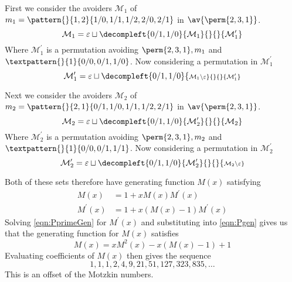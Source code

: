 \begin{frame}
  First we consider the avoiders \(\mathcal{M}_1\) of \(m_1 = \pattern{}{1,2}{1/0,1/1,1/2,2/0,2/1} \) in \(\av{\perm{2,3,1}}\).
  \begin{equation*}
    \mathcal{M}_1 = \varepsilon \sqcup
    \decompleft{0/1,1/0}{\mathcal{M}_1}{}{}{\mathcal{M}^\prime_1}
\end{equation*}
Where \(\mathcal{M}^\prime_1\) is a permutation avoiding \(\perm{2,3,1}, m_1\)
and \(\textpattern{}{1}{0/0,0/1,1/0}\). \pause Now considering a permutation in \(\mathcal{M}^\prime_1\)
\begin{equation*}
    \mathcal{M}^\prime_1 = \varepsilon \sqcup
    \decompleft{0/1,1/0}{\scriptstyle \mathcal{M}_1\setminus\varepsilon}{}{}{\mathcal{M}^\prime_1}
\end{equation*}
\end{frame}

\begin{frame}
  Next we consider the avoiders \(\mathcal{M}_2\) of \(m_2 = \pattern{}{2,1}{0/1,1/0,1/1,1/2,2/1}\) in \(\av{\perm{2,3,1}}\).
  \begin{equation*}
    \mathcal{M}_2 = \varepsilon \sqcup
    \decompleft{0/1,1/0}{\mathcal{M}^\prime_2}{}{}{\mathcal{M}_2}
\end{equation*}
Where \(\mathcal{M}^\prime_2\) is a permutation avoiding \(\perm{2,3,1}, m_2\)
and \(\textpattern{}{1}{0/0,0/1,1/1}\). \pause Now considering a permutation in \(\mathcal{M}^\prime_2\)
\begin{equation*}
    \mathcal{M}^\prime_2 = \varepsilon \sqcup
    \decompleft{0/1,1/0}{\mathcal{M}^\prime_2}{}{}{\scriptstyle \mathcal{M}_2\setminus\varepsilon}
\end{equation*}
\end{frame}
\begin{frame}
  Both of these sets therefore have generating function \(M(x)\) satisfying
  \begin{align}
    M(x) &= 1 + xM(x)M^\prime(x) \label{eqn:Pgen}\\
    M^\prime(x) &= 1 + x(M(x)-1)M^\prime(x)\label{eqn:PprimeGen}
 \end{align}\pause
 Solving \ref{eqn:PprimeGen} for \(M^\prime(x)\) and substituting into
\ref{eqn:Pgen} gives us that the generating function for
\(M(x)\) satisfies
\begin{equation}
    M(x) = xM^2(x) - x(M(x) - 1) + 1
\end{equation}\pause
Evaluating coefficients of \(M(x)\) then gives the sequence
\begin{equation*}
    1, 1, 1, 2, 4, 9, 21, 51, 127, 323, 835,\dotsc
\end{equation*}
This is an offset of the Motzkin numbers.
\end{frame}

